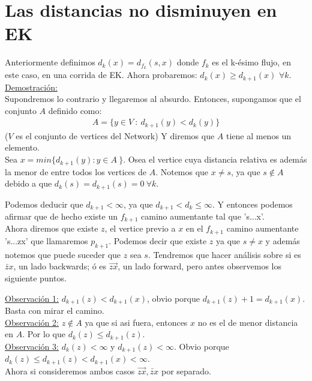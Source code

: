 \documentclass{article}
\begin{document}
\section{Las distancias no disminuyen en EK}
Anteriormente definimos $d_k(x) = d_{f_k}(s,x)$ donde  $f_k$ es el k-ésimo flujo, en este caso,
en una corrida de EK. Ahora probaremos: $d_k(x) \geq d_{k+1}(x)$ $\forall k$.
\underline{Demostración:}\\
Supondremos lo contrario y llegaremos al absurdo. Entonces, supongamos que el conjunto $A$ definido
como:
\begin{equation}
	\begin{aligned}
		A = \{ y \in V \ : \ d_{k+1}(y) < d_k(y) \} 
	\end{aligned}
\end{equation}
($V$ es el conjunto de vertices del Network)
Y diremos que $A$ tiene al menos un elemento.\\
Sea $x = min \{ d_{k+1}(y) : y \in A \ \} $. Osea el vertice cuya distancia relativa es además
la menor de entre todos los vertices de $A$.
Notemos que $x \neq s$, ya que  $s \notin A$ debido a que $d_k(s) = d_{k+1}(s) = 0 \  \forall k$.

Podemos deducir que $d_{k+1} < \infty $, ya que $d_{k+1} < d_k \leq \infty$. Y entonces podemos
afirmar que de hecho existe un $f_{k+1}$ camino aumentante tal que 's...x'.\\

Ahora diremos que existe $z$, el vertice previo a $x$ en el $f_{k+1}$ camino aumentante 's...zx' que
llamaremos $p_{k+1}$. Podemos decir que existe $z$ ya que $s\neq x$ y además notemos que puede suceder que $z$ sea $s$.
Tendremos que hacer análisis sobre si es $\overleftarrow{zx}$, un lado
backwards; ó es $\overrightarrow{zx}$, un lado forward, pero antes observemos los siguiente puntos.


\underline{Observación 1:} $d_{k+1}(z) < d_{k+1}(x)$, obvio porque $d_{k+1}(z) + 1 = d_{k+1}(x)$.
Basta con mirar el camino.\\

\underline{Observación 2:} $z \notin A$ ya que si asi fuera, entonces $x$ no es el de menor
distancia en $A$. Por lo que $d_k(z) \leq d_{k+1}(z)$.\\

\underline{Observación 3:} $d_k(z) < \infty $ y $d_{k+1}(z) < \infty$.
Obvio porque $d_k(z) \leq d_{k+1}(z) < d_{k+1}(x) < \infty$.\\

Ahora si consideremos ambos casos $\overrightarrow{zx}, \overleftarrow{zx}$ por separado.\\
\end{document}
